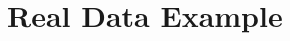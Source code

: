 \documentclass[11pt]{article}
\theoremstyle{definition}
\begin{document}
	
	
	
	
	\section{Real Data Example}
	\label{sec:real}
	
\end{document}
